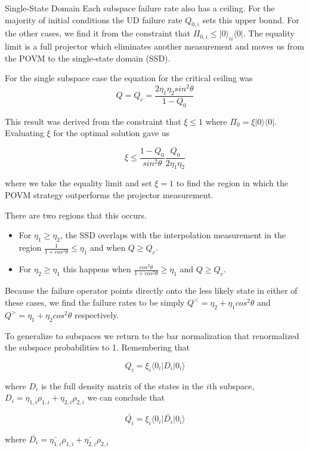 \documentclass{beamer}
\begin{document}
\begin{frame}{Single-State Domain}
Each subspace failure rate also has a ceiling.  For the majority of initial conditions the UD failure rate $Q_{0,i}$ sets this upper bound.  For the other cases, we find it from the constraint that $\Pi_{0,i} \leq \vert 0 \rangle_{ii} \langle 0 \vert $.  The equality limit is a full projector which eliminates another measurement and moves us from the POVM to the single-state domain (SSD).
\end{frame}
\begin{frame}
For the single subspace case the equation for the critical ceiling was
\[ Q = Q_c = \frac{2\eta_1\eta_2 sin^2 \theta}{1-Q_0}\]

This result was derived from the constraint that $\xi \leq 1$ where $ \Pi_0 = \xi \vert 0 \rangle \langle 0 \vert$.  Evaluating $\xi$ for the optimal solution gave us 

\[ \xi \leq \frac{1-Q_0}{sin^2 \theta} \frac{Q_0}{2 \eta_1 \eta_2}\]

 where we take the equality limit and set $\xi = 1$ to find the region in which the POVM strategy outperforms the projector measurement. 
\end{frame}
\begin{frame}
There are two regions that this occurs. 
\begin{itemize}
\item
For $\eta_1 \geq \eta_2$, the SSD overlaps with the interpolation measurement in the region $\frac{1}{1 + cos^2 \theta} \leq \eta_1$ and when $Q \geq Q_c$.  

\item
For $\eta_2 \geq \eta_1$ this happens when $\frac{cos^2 \theta}{1+cos^2\theta} \geq \eta_1$ and  $Q \geq Q_c$. 
\end{itemize}
 Because the failure operator points directly onto the less likely state in either of these cases, we find the failure rates to be simply $Q^<= \eta_2 + \eta_1 cos^2 \theta$ and $Q^> = \eta_1 + \eta_2 cos^2 \theta$ respectively. 
\end{frame}
\begin{frame}
To generalize to subspaces we return to the bar normalization that renormalized the subspace probabilities to 1.  Remembering that

\[Q_i =  \xi_i \langle 0_i \vert D_i \vert 0_i \rangle\]

where $D_i$ is the full density matrix of the states in the $i$th subspace, $ D_i = \eta_{1,i} \rho_{1,i} + \eta_{2,i} \rho_{2,i}$ we can conclude that 

\[ \bar{Q_i} = \xi_i \langle 0_i \vert \bar{D_i} \vert 0_i \rangle\] 

where $\bar{D_i} = \bar{\eta_{1,i}} \rho_{1,i} + \bar{\eta_{2,i}} \rho_{2,i}$
\end{frame}
\end{document}
